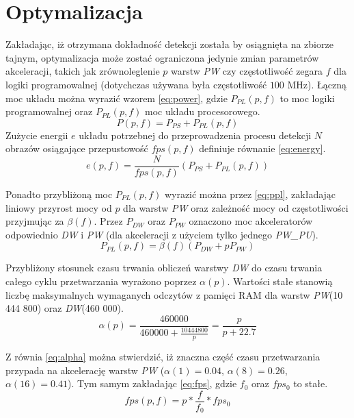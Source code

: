 \section{Optymalizacja}
Zakładając, iż otrzymana dokładność detekcji została by osiągnięta na zbiorze tajnym, optymalizacja może zostać ograniczona jedynie zmian parametrów akceleracji, takich jak zrównoleglenie $p$ warstw \emph{PW} czy częstotliwość zegara $f$ dla logiki programowalnej (dotychczas używana była częstotliwość $100$ MHz).
Łączną moc układu można wyrazić wzorem \eqref{eq:power}, gdzie $P_{PL}(p,f)$ to moc logiki programowalnej oraz $P_{PL}(p,f)$ moc układu procesorowego.
\begin{equation}
P(p,f) = P_{PS} + P_{PL}(p,f)
\label{eq:power}
\end{equation}
Zużycie energii $e$ układu potrzebnej do przeprowadzenia procesu detekcji $N$ obrazów osiągające przepustowość $fps(p,f)$ definiuje równanie \eqref{eq:energy}.
\begin{equation}
e(p,f) = \frac{N}{fps(p,f)}(P_{PS} + P_{PL}(p,f))
\label{eq:energy}
\end{equation}

Ponadto przybliżoną moc $P_{PL}(p,f)$ wyrazić można przez \eqref{eq:ppl}, zakładając liniowy przyrost mocy od $p$ dla warstw \emph{PW} oraz zależność mocy od częstotliwości przyjmując za $\beta(f)$. Przez $P_{DW}$ oraz $P_{PW}$ oznaczono moc akceleratorów odpowiednio \emph{DW} i \emph{PW} (dla akceleracji z użyciem tylko jednego \emph{PW\_PU}).
\begin{equation}
P_{PL}(p,f) = \beta(f) (P_{DW} + p P_{PW})
\label{eq:ppl}
\end{equation}

Przybliżony stosunek czasu trwania obliczeń warstwy \emph{DW} do czasu trwania całego cyklu przetwarzania wyrażono poprzez $\alpha(p)$. 
Wartości stałe stanowią liczbę maksymalnych wymaganych odczytów z pamięci RAM dla  warstw \emph{PW}(10 444 800) oraz \emph{DW}(460 000).
\begin{equation}
\alpha(p) = \frac{460 000}{460 000 + \frac{10 444 800}{p}} = \frac{p}{p+22.7}
\label{eq:alpha}
\end{equation}

Z równia \eqref{eq:alpha} można stwierdzić, iż znaczna część czasu przetwarzania przypada na akcelerację warstw \emph{PW} ($\alpha(1) = 0.04$, $\alpha(8) = 0.26$,  $\alpha(16) = 0.41$).
Tym samym zakładając \eqref{eq:fps}, gdzie $f_0$ oraz $fps_0$ to stałe.
\begin{equation}
fps(p,f) = p*\frac{f}{f_0}* fps_0
\label{eq:fps}
\end{equation}

